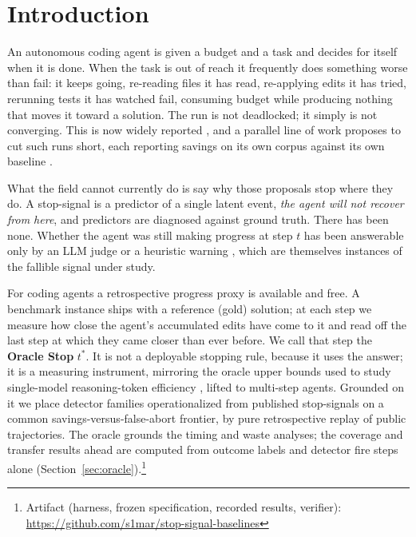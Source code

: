 \documentclass[sigconf,screen]{acmart}
\begin{document}

\maketitle

\section{Introduction}
An autonomous coding agent is given a budget and a task and decides for itself when it is done.
When the task is out of reach it frequently does something worse than fail: it keeps going,
re-reading files it has read, re-applying edits it has tried, rerunning tests it has watched fail,
consuming budget while producing nothing that moves it toward a solution. The run is not deadlocked;
it simply is not converging. This is now widely reported \cite{bouzenia2025understanding,
understandingcodeagent2025, coherencecollapse2026, resolveratehides2026}, and a parallel line of
work proposes to cut such runs short, each reporting savings on its own corpus against its own
baseline \cite{bagen2026, earlydiagnosis2026, agentstop2026, shp2026, eet2026}.

What the field cannot currently do is say why those proposals stop where they do. A stop-signal is
a predictor of a single latent event, \emph{the agent will not recover from here}, and predictors are
diagnosed against ground truth. There has been none. Whether the agent was still making progress at
step $t$ has been answerable only by an LLM judge \cite{shp2026} or a heuristic warning
\cite{earlydiagnosis2026}, which are themselves instances of the fallible signal under study.

For coding agents a retrospective progress proxy is available and free. A benchmark instance ships
with a reference (gold) solution; at each step we measure how close the agent's accumulated edits
have come to it and read off the last step at which they came closer than ever before. We call that
step the \textbf{Oracle Stop} $t^{*}$. It is not a deployable stopping rule, because it uses the
answer; it is a measuring instrument, mirroring the oracle upper bounds used to study single-model
reasoning-token efficiency \cite{beyondaccuracy2026}, lifted to multi-step agents. Grounded on it we
place detector families operationalized from published stop-signals on a common
savings-versus-false-abort frontier, by pure retrospective replay of public trajectories. The
oracle grounds the timing and waste analyses; the coverage and transfer results ahead are computed
from outcome labels and detector fire steps alone (Section~\ref{sec:oracle}).\footnote{Artifact
(harness, frozen specification, recorded results, verifier):
\url{https://github.com/s1mar/stop-signal-baselines}}
\end{document}
